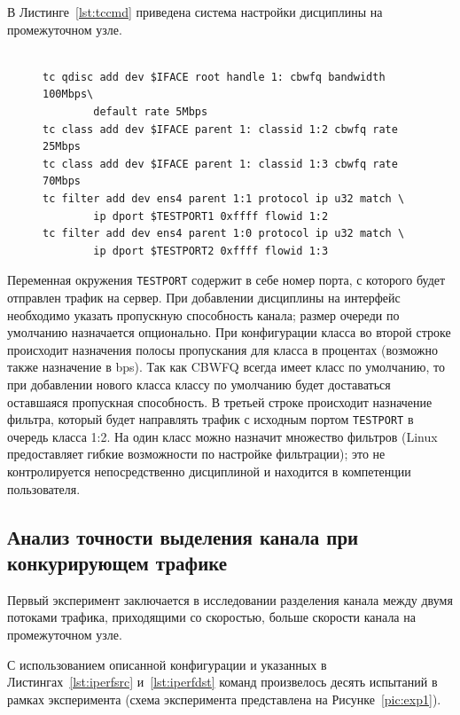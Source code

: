 		В Листинге~\ref{lst:tccmd} приведена система настройки дисциплины на промежуточном узле.
        \begin{figure}[ht!]
    		\center
    		\begin{lstlisting}[frame=lines,
    						  caption={Список команд для конфигурации дисциплины обслуживания CBWFQ.},
    						  label={lst:tccmd},
    						  style=tcstyle]

tc qdisc add dev $IFACE root handle 1: cbwfq bandwidth 100Mbps\
        default rate 5Mbps
tc class add dev $IFACE parent 1: classid 1:2 cbwfq rate 25Mbps
tc class add dev $IFACE parent 1: classid 1:3 cbwfq rate 70Mbps
tc filter add dev ens4 parent 1:1 protocol ip u32 match \
        ip dport $TESTPORT1 0xffff flowid 1:2
tc filter add dev ens4 parent 1:0 protocol ip u32 match \
        ip dport $TESTPORT2 0xffff flowid 1:3
    		\end{lstlisting}
        \end{figure}
		Переменная окружения \lstinline{TESTPORT} содержит в себе номер порта,
		с которого будет отправлен трафик на сервер. При добавлении дисциплины
		на интерфейс необходимо указать пропускную способность канала; размер
		очереди по умолчанию назначается опционально. При конфигурации класса
		во второй строке происходит назначения полосы пропускания для класса
		в процентах (возможно также назначение в bps).
        Так как CBWFQ всегда имеет класс по умолчанию, то
		при добавлении нового класса классу по умолчанию будет доставаться
		оставшаяся пропускная способность.
        В третьей строке происходит
		назначение фильтра, который будет направлять трафик с исходным портом \lstinline{TESTPORT}
		в очередь класса 1:2. На один класс можно назначит множество фильтров
		(Linux предоставляет гибкие возможности по настройке фильтрации); это не
		контролируется непосредственно дисциплиной и находится в компетенции
		пользователя. 

		\subsection{Анализ точности выделения канала при конкурирующем трафике}
			
			Первый эксперимент заключается в исследовании разделения канала между
			двумя потоками трафика, приходящими со скоростью, больше скорости канала на
			промежуточном узле.

    		С использованием описанной конфигурации и указанных в Листингах~\ref{lst:iperfsrc} и~\ref{lst:iperfdst}
			команд произвелось десять испытаний в рамках эксперимента (схема
			эксперимента представлена на Рисунке~\ref{pic:exp1}).

